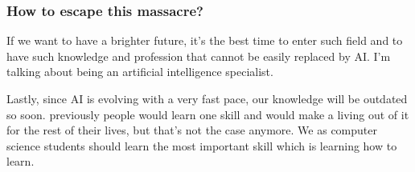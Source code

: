 \documentclass[twocolumn,a4paper, 10pt]{article}
\begin{document}
		\subsubsection{How to escape this massacre?}
			If we want to have a brighter future, it's the best time to enter such field and
			to have such knowledge and profession that cannot be easily replaced by AI. I'm talking about
			being an artificial intelligence specialist.

			Lastly, since AI is evolving with a very fast pace, our knowledge will be outdated so soon. 
			previously people would learn one skill and would make a living out of it for the rest of their lives,
			but that's not the case anymore. We as computer science students should learn the most important skill
			which is learning how to learn.
\end{document}
